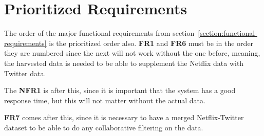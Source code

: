 \section{Prioritized Requirements}
The order of the major functional requirements from section~\ref{section:functional-requirements} is the prioritized order also. \textbf{FR1} and \textbf{FR6} must be in the order they are numbered since the next will not work without the one before, meaning, the harvested data is needed to be able to supplement the Netflix data with Twitter data.

The \textbf{NFR1} is after this, since it is important that the system has a good response time, but this will not matter without the actual data.

\textbf{FR7} comes after this, since it is necessary to have a merged Netflix-Twitter dataset to be able to do any collaborative filtering on the data.
